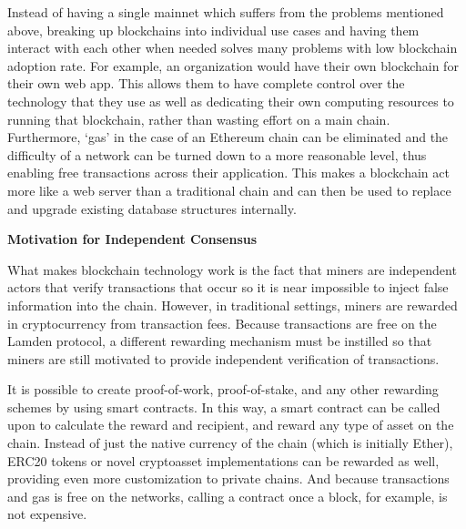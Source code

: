 \documentclass{%
	article}
\begin{document}
Instead of having a single mainnet which suffers from the problems mentioned above, breaking up blockchains into individual use cases and having them interact with each other when needed solves many problems with low blockchain adoption rate. For example, an organization would have their own blockchain for their own web app. This allows them to have complete control over the technology that they use as well as dedicating their own computing resources to running that blockchain, rather than wasting effort on a main chain. Furthermore, ‘gas’ in the case of an Ethereum chain can be eliminated and the difficulty of a network can be turned down to a more reasonable level, thus enabling free transactions across their application. This makes a blockchain act more like a web server than a traditional chain and can then be used to replace and upgrade existing database structures internally.

\begin{center}
\textbf{Motivation for Independent Consensus}
\end{center}

What makes blockchain technology work is the fact that miners are independent actors that verify transactions that occur so it is near impossible to inject false information into the chain. However, in traditional settings, miners are rewarded in cryptocurrency from transaction fees. Because transactions are free on the Lamden protocol, a different rewarding mechanism must be instilled so that miners are still motivated to provide independent verification of transactions\cite{verifincent}.

It is possible to create proof-of-work, proof-of-stake, and any other rewarding schemes by using smart contracts. In this way, a smart contract can be called upon to calculate the reward and recipient, and reward any type of asset on the chain. Instead of just the native currency of the chain (which is initially Ether), ERC20 tokens or novel cryptoasset implementations can be rewarded as well, providing even more customization to private chains. And because transactions and gas is free on the networks, calling a contract once a block, for example, is not expensive.
\end{document}
